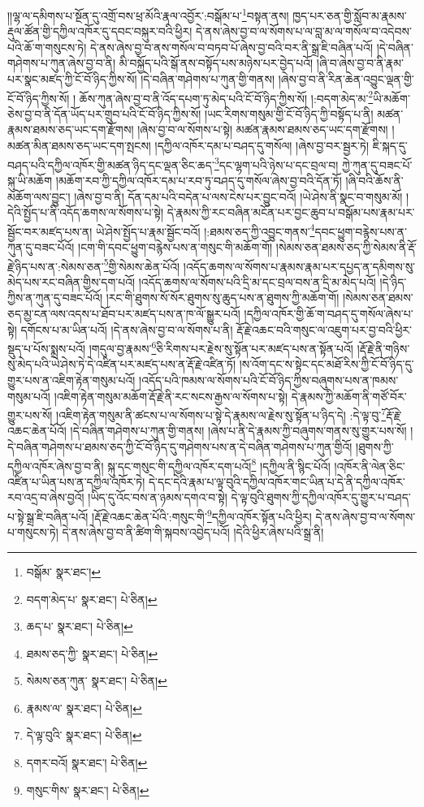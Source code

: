 །།ལྷ་ལ་དམིགས་པ་སྔོན་དུ་འགྲོ་བས་ཕྲ་མོའི་རྣལ་འབྱོར་:བསྒོམ་པ་\footnote{བསྒོམ་  སྣར་ཐང་། }བསྟན་ནས། ཁྱད་པར་ཅན་གྱི་སློབ་མ་རྣམས་རྡུལ་ཚོན་གྱི་དཀྱིལ་འཁོར་དུ་དབང་བསྐུར་བའི་ཕྱིར། དེ་ནས་ཞེས་བྱ་བ་ལ་སོགས་པ་ལ་བླ་མ་ལ་གསོལ་བ་འདེབས་པའི་ཆོ་ག་གསུངས་ཏེ། དེ་ནས་ཞེས་བྱ་བ་ནས་གསོལ་བ་བཏབ་པོ་ཞེས་བྱ་བའི་བར་ནི་སྒྲ་ཇི་བཞིན་པའོ། །དེ་བཞིན་གཤེགས་པ་ཀུན་ཞེས་བྱ་བ་ནི། མི་བསྐྱོད་པའི་སྒོ་ནས་བསྟོད་པས་མཉེས་པར་བྱེད་པའོ། །ཞི་བ་ཞེས་བྱ་བ་ནི་རྣམ་པར་སྣང་མཛད་ཀྱི་ངོ་བོ་ཉིད་ཀྱིས་སོ། །དེ་བཞིན་གཤེགས་པ་ཀུན་གྱི་གནས། །ཞེས་བྱ་བ་ནི་རིན་ཆེན་འབྱུང་ལྡན་གྱི་ངོ་བོ་ཉིད་ཀྱིས་སོ། །
ཆོས་ཀུན་ཞེས་བྱ་བ་ནི་འོད་དཔག་ཏུ་མེད་པའི་ངོ་བོ་ཉིད་ཀྱིས་སོ། །:བདག་མེད་མ་\footnote{བདག་མེད་པ་  སྣར་ཐང་།  པེ་ཅིན། }ཡི་མཆོག་ཅེས་བྱ་བ་ནི་དོན་ཡོད་པར་གྲུབ་པའི་ངོ་བོ་ཉིད་ཀྱིས་སོ། །ཡང་རིགས་གསུམ་གྱི་ངོ་བོ་ཉིད་ཀྱི་བསྟོད་པ་ནི། མཚན་རྣམས་ཐམས་ཅད་ཡང་དག་རྫོགས། །ཞེས་བྱ་བ་ལ་སོགས་པ་སྟེ། མཚན་རྣམས་ཐམས་ཅད་ཡང་དག་རྫོགས། །མཚན་མིན་ཐམས་ཅད་ཡང་དག་སྤངས། །དཀྱིལ་འཁོར་དམ་པ་བཤད་དུ་གསོལ། །ཞེས་བྱ་བར་སྦྱར་ཏེ། ཇི་སྐད་དུ་བཤད་པའི་དཀྱིལ་འཁོར་གྱི་མཚན་ཉིད་དང་ལྡན་ཅིང་ཆད་\footnote{ཆད་པ་  སྣར་ཐང་།  པེ་ཅིན། }དང་ལྷག་པའི་ཉེས་པ་དང་བྲལ་བ། ཀྱེ་ཀུན་དུ་བཟང་པོ་སྐུ་ཡི་མཆོག །མཆོག་རབ་ཀྱི་དཀྱིལ་འཁོར་དམ་པ་རབ་ཏུ་བཤད་དུ་གསོལ་ཞེས་བྱ་བའི་དོན་ཏོ། །ཞི་བའི་ཆོས་ནི་མཆོག་ལས་བྱུང་། །ཞེས་བྱ་བ་ནི། དོན་དམ་པའི་བདེན་པ་ལས་ངེས་པར་བྱུང་བའོ། །ཡེ་ཤེས་ནི་སྣང་བ་གསུམ་མོ། །དེའི་སྤྱོད་པ་ནི་འདོད་ཆགས་ལ་སོགས་པ་སྟེ། དེ་རྣམས་ཀྱི་རང་བཞིན་མངོན་པར་བྱང་ཆུབ་པ་བསྒོམ་པས་རྣམ་པར་སྦྱོང་བར་མཛད་པས་ན། ཡེ་ཤེས་སྤྱོད་པ་རྣམ་སྦྱོང་བའོ། །:ཐམས་ཅད་ཀྱི་འབྱུང་གནས་\footnote{ཐམས་ཅད་ཀྱི་  སྣར་ཐང་།  པེ་ཅིན། }དབང་ཕྱུག་བརྙེས་པས་ན་ཀུན་དུ་བཟང་པོའོ། །ངག་གི་དབང་ཕྱུག་བརྙེས་པས་ན་གསུང་གི་མཆོག་གོ། །སེམས་ཅན་ཐམས་ཅད་ཀྱི་སེམས་ནི་རྡོ་རྗེ་ཉིད་པས་ན་:སེམས་ཅན་\footnote{སེམས་ཅན་ཀུན་  སྣར་ཐང་།  པེ་ཅིན། }གྱི་སེམས་ཆེན་པོའོ། །འདོད་ཆགས་ལ་སོགས་པ་རྣམས་རྣམ་པར་དཔྱད་ན་དམིགས་སུ་མེད་པས་རང་བཞིན་གྱིས་དག་པའོ། །འདོད་ཆགས་ལ་སོགས་པའི་དྲི་མ་དང་བྲལ་བས་ན་དྲི་མ་མེད་པའོ། །དེ་ཉིད་ཀྱིས་ན་ཀུན་དུ་བཟང་པོའོ། །རང་གི་ཐུགས་སོ་སོར་ཐུགས་སུ་ཆུད་པས་ན་ཐུགས་ཀྱི་མཆོག་གོ། །སེམས་ཅན་ཐམས་ཅད་མྱ་ངན་ལས་འདས་པ་ཐོབ་པར་མཛད་པས་ན་ཁ་ལོ་སྒྱུར་པའོ། །དཀྱིལ་འཁོར་གྱི་ཆོ་ག་བཤད་དུ་གསོལ་ཞེས་པ་སྟེ། དགོངས་པ་མ་ཡིན་པའོ། །དེ་ནས་ཞེས་བྱ་བ་ལ་སོགས་པ་ནི། རྡོ་རྗེ་འཆང་བའི་གསུང་ལ་འཇུག་པར་བྱ་བའི་ཕྱིར་སྡུད་པ་པོས་སྨྲས་པའོ། །གདུལ་བྱ་རྣམས་\footnote{རྣམས་ལ་  སྣར་ཐང་།  པེ་ཅིན། }ཅི་རིགས་པར་རྗེས་སུ་སྟོན་པར་མཛད་པས་ན་སྟོན་པའོ། །རྡོ་རྗེ་ནི་གཉིས་སུ་མེད་པའི་ཡེ་ཤེས་ཏེ་དེ་འཛིན་པར་མཛད་པས་ན་རྡོ་རྗེ་འཛིན་ཏོ། །ས་འོག་དང་ས་སྟེང་དང་མཐོ་རིས་ཀྱི་ངོ་བོ་ཉིད་དུ་གྱུར་པས་ན་འཇིག་རྟེན་གསུམ་པའོ། །འདོད་པའི་ཁམས་ལ་སོགས་པའི་ངོ་བོ་ཉིད་ཀྱིས་བཞུགས་པས་ན་ཁམས་གསུམ་པའོ། །འཇིག་རྟེན་གསུམ་མཆོག་རྡོ་རྗེ་ནི་རང་སངས་རྒྱས་ལ་སོགས་པ་སྟེ། དེ་རྣམས་ཀྱི་མཆོག་ནི་གཙོ་བོར་གྱུར་པས་སོ། །འཇིག་རྟེན་གསུམ་ནི་ཚངས་པ་ལ་སོགས་པ་སྟེ་དེ་རྣམས་ལ་རྗེས་སུ་སྟོན་པ་ཉིད་དེ། :དེ་ལྟ་བུ་\footnote{དེ་ལྟ་བུའི་  སྣར་ཐང་།  པེ་ཅིན། }རྡོ་རྗེ་འཆང་ཆེན་པོའོ། །དེ་བཞིན་གཤེགས་པ་ཀུན་གྱི་གནས། །ཞེས་པ་ནི་དེ་རྣམས་ཀྱི་བཞུགས་གནས་སུ་གྱུར་པས་སོ། །དེ་བཞིན་གཤེགས་པ་ཐམས་ཅད་ཀྱི་ངོ་བོ་ཉིད་དུ་གཤེགས་པས་ན་དེ་བཞིན་གཤེགས་པ་ཀུན་གྱིའོ། །ཐུགས་ཀྱི་དཀྱིལ་འཁོར་ཞེས་བྱ་བ་ནི། སྐུ་དང་གསུང་གི་དཀྱིལ་འཁོར་དག་པའོ།\footnote{དགར་བའོ།  སྣར་ཐང་།  པེ་ཅིན། } །དཀྱིལ་ནི་སྙིང་པོའོ། །འཁོར་ནི་ལེན་ཅིང་འཛིན་པ་ཡིན་པས་ན་དཀྱིལ་འཁོར་ཏེ། དེ་དང་དེའི་རྣམ་པ་ལྟ་བུའི་དཀྱིལ་འཁོར་གང་ཡིན་པ་དེ་ནི་དཀྱིལ་འཁོར་རབ་འདྲ་བ་ཞེས་བྱའོ། །ཡིད་དུ་འོང་བས་ན་ཉམས་དགའ་བ་སྟེ། དེ་ལྟ་བུའི་ཐུགས་ཀྱི་དཀྱིལ་འཁོར་དུ་གྱུར་པ་བཤད་པ་སྟེ་སྒྲ་ཇི་བཞིན་པའོ། །རྡོ་རྗེ་འཆང་ཆེན་པོའི་:གསུང་གི་\footnote{གསུང་གིས་  སྣར་ཐང་།  པེ་ཅིན། }དཀྱིལ་འཁོར་སྟོན་པའི་ཕྱིར། དེ་ནས་ཞེས་བྱ་བ་ལ་སོགས་པ་གསུངས་ཏེ། དེ་ནས་ཞེས་བྱ་བ་ནི་ཚིག་གི་སྐབས་འབྱེད་པའོ། །དེའི་ཕྱིར་ཞེས་པའི་སྒྲ་ནི། 
